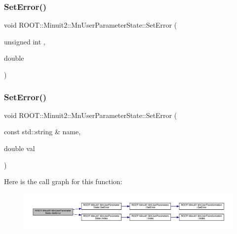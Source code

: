 \subsubsection{\texorpdfstring{SetError()}{SetError()}\hspace{0.1cm}{\footnotesize\ttfamily [3/6]}}
{\footnotesize\ttfamily void R\+O\+O\+T\+::\+Minuit2\+::\+Mn\+User\+Parameter\+State\+::\+Set\+Error (\begin{DoxyParamCaption}\item[{unsigned int}]{,  }\item[{double}]{ }\end{DoxyParamCaption})}

\mbox{\label{classROOT_1_1Minuit2_1_1MnUserParameterState_a7960c179d85d1595f02772c4a8dff85f}} 
\subsubsection{\texorpdfstring{SetError()}{SetError()}\hspace{0.1cm}{\footnotesize\ttfamily [4/6]}}
{\footnotesize\ttfamily void R\+O\+O\+T\+::\+Minuit2\+::\+Mn\+User\+Parameter\+State\+::\+Set\+Error (\begin{DoxyParamCaption}\item[{const std\+::string \&}]{name,  }\item[{double}]{val }\end{DoxyParamCaption})}

Here is the call graph for this function\+:
\nopagebreak
\begin{figure}[H]
\begin{center}
\leavevmode
\includegraphics[width=350pt]{d3/de0/classROOT_1_1Minuit2_1_1MnUserParameterState_a7960c179d85d1595f02772c4a8dff85f_cgraph}
\end{center}
\end{figure}
\mbox{\label{classROOT_1_1Minuit2_1_1MnUserParameterState_a7960c179d85d1595f02772c4a8dff85f}} 
